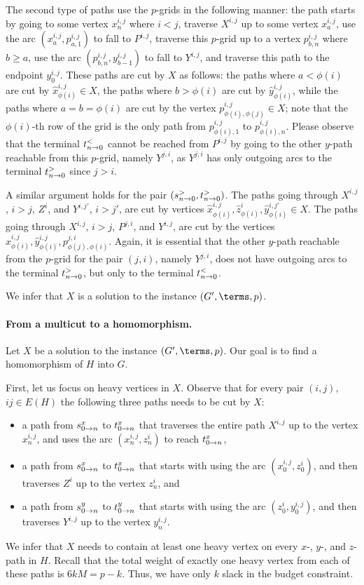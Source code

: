 The second type of paths use the $p$-grids in the following manner: the path starts by going to some vertex $x^{i,j}_n$ where $i < j$,
traverse $X^{i,j}$ up to some vertex $x^{i,j}_a$, use the arc $(x^{i,j}_a,p^{i,j}_{a,1})$ to fall to $P^{i,j}$,
traverse this $p$-grid up to a vertex $p^{i,j}_{b,n}$ where $b \geq a$, use the arc $(p^{i,j}_{b,n}, y^{i,j}_{b-1})$ to fall to $Y^{i,j}$,
and traverse this path to the endpoint $y^{i,j}_0$. These paths are cut by $X$ as follows: the paths where $a < \phi(i)$ are cut by $\hat{x}^{i,j}_{\phi(i)} \in X$,
the paths where $b > \phi(i)$ are cut by $\hat{y}^{i,j}_{\phi(i)}$, while the paths where $a=b=\phi(i)$ are cut by the vertex $p^{i,j}_{\phi(i),\phi(j)} \in X$;
note that the $\phi(i)$-th row of the grid is the only path from $p^{i,j}_{\phi(i),1}$ to $p^{i,j}_{\phi(i),n}$.
Please observe that the terminal $t_{n \to 0}^{<}$ cannot be reached from $P^{i,j}$ by going to the other $y$-path reachable from this $p$-grid,
namely $Y^{j,i}$, as $Y^{j,i}$ has only outgoing arcs to the terminal $t_{n \to 0}^{>}$ since $j > i$.

A similar argument holds for the pair $(s_{n \to 0}^{>},t_{n \to 0}^{>})$. The paths going through $X^{i,j}$, $i > j$,
$Z^i$, and $Y^{i,j'}$, $i > j'$, are cut by vertices
$\hat{x}^{i,j}_{\phi(i)}, \hat{z}^i_{\phi(i)}, \hat{y}^{i,j'}_{\phi(i)} \in X$.
The paths going through $X^{i,j}$, $i > j$, $P^{j,i}$, and $Y^{i,j}$,
are cut by the vertices $\hat{x}^{i,j}_{\phi(i)}, \hat{y}^{i,j}_{\phi(i)}, p^{j,i}_{\phi(j),\phi(i)}$. Again, it is essential that the other $y$-path
reachable from the $p$-grid for the pair $(j,i)$, namely $Y^{j,i}$, does not have outgoing arcs to the terminal $t_{n \to 0}^{>}$, but only
to the terminal $t_{n \to 0}^{<}$.

We infer that $X$ is a solution to the \dirmc{} instance $(G',\terms,p)$.

\paragraph{From a multicut to a homomorphism.}
Let $X$ be a solution to the \dirmc{} instance $(G',\terms,p)$. Our goal is to find a homomorphism of $H$ into $G$.

First, let us focus on heavy vertices in $X$. Observe that for every pair $(i,j)$, $ij \in E(H)$ the following three paths needs to be cut by $X$:
\begin{itemize}
\item
a path from $s_{0 \to n}^{x}$ to $t_{0 \to n}^{x}$ that traverses the entire path $X^{i,j}$ up to the vertex $x^{i,j}_n$, and uses the arc $(x^{i,j}_n,z^i_n)$ to reach
$t_{0 \to n}^{x}$, 
\item a path from $s_{0 \to n}^{x}$ to $t_{0 \to n}^{x}$ that starts with using the arc $(x^{i,j}_0,z^i_0)$, and then traverses $Z^i$
up to the vertex $z^i_n$, and 
\item a path from $s_{0 \to n}^{y}$ to $t_{0 \to n}^{y}$ that starts with using the arc $(z^i_0,y^{i,j}_0)$, and then traverses $Y^{i,j}$
up to the vertex $y^{i,j}_n$.
\end{itemize}
We infer that $X$ needs to contain at least one heavy vertex on every $x$-, $y$-, and $z$-path in $H$. Recall that the total weight of exactly one heavy vertex from 
each of these paths is $6kM = p-k$. Thus, we have only $k$ slack in the budget constraint.


